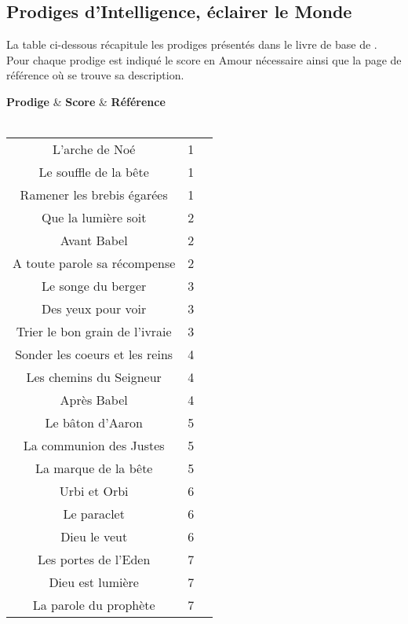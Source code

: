     \subsection{Prodiges d'Intelligence, éclairer le Monde}\label{subsec:prodigesintelligence}
    La table ci-dessous récapitule les prodiges présentés dans le livre de base de . Pour chaque prodige est indiqué le score en Amour nécessaire ainsi que la page de référence où se trouve sa description.
    \begin{center} 
\tablehead
	{\hline \textbf{Prodige} & \textbf{Score} & \textbf{Référence}\\ \hline}
\tabletail
	{\hline {}\\}
\tablelasttail
	{\hline}
\begin{supertabular}{|c|c|c|}

L'arche de Noé & 1 & \cite[p.245]{MC} \\
Le souffle de la bête & 1 & \cite[p.245]{MC} \\
Ramener les brebis égarées & 1 & \cite[p.245]{MC} \\ 
Que la lumière soit & 2 & \cite[p.245]{MC} \\ 
Avant Babel & 2 & \cite[p.246]{MC} \\
A toute parole sa récompense & 2 & \cite[p.246]{MC} \\
Le songe du berger & 3 & \cite[p.246]{MC} \\ 
Des yeux pour voir & 3 & \cite[p.246]{MC} \\ 
Trier le bon grain de l'ivraie & 3 & \cite[p.246]{MC} \\
Sonder les coeurs et les reins & 4 & \cite[p.246]{MC} \\
Les chemins du Seigneur & 4 & \cite[p.246]{MC} \\ 
Après Babel & 4 & \cite[p.246]{MC} \\ 
Le bâton d'Aaron & 5 & \cite[p.247]{MC} \\
La communion des Justes & 5 & \cite[p.247]{MC} \\
La marque de la bête & 5 & \cite[p.247]{MC} \\ 
Urbi et Orbi & 6 & \cite[p.247]{MC} \\ 
Le paraclet & 6 & \cite[p.247]{MC} \\
Dieu le veut & 6 & \cite[p.247]{MC} \\
Les portes de l'Eden & 7 & \cite[p.248]{MC} \\ 
Dieu est lumière & 7 & \cite[p.248]{MC} \\ 
La parole du prophète & 7 & \cite[p.248]{MC} \\

\end{supertabular}
\end{center}

